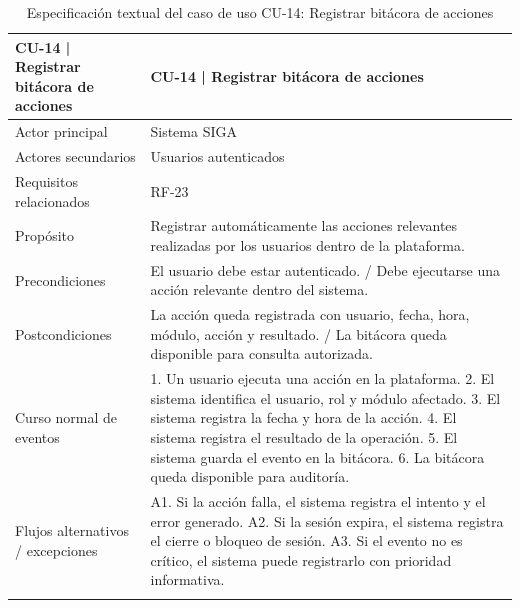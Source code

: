 \begingroup
\small
\begin{longtable}{|P{0.5000}|P{0.5000}|}
\hline
CU-14 | Registrar bitácora de acciones & CU-14 | Registrar bitácora de acciones \\ \hline
Actor principal & Sistema SIGA \\ \hline
Actores secundarios & Usuarios autenticados \\ \hline
Requisitos relacionados & RF-23 \\ \hline
Propósito & Registrar automáticamente las acciones relevantes realizadas por los usuarios dentro de la plataforma. \\ \hline
Precondiciones & El usuario debe estar autenticado. / Debe ejecutarse una acción relevante dentro del sistema. \\ \hline
Postcondiciones & La acción queda registrada con usuario, fecha, hora, módulo, acción y resultado. / La bitácora queda disponible para consulta autorizada. \\ \hline
Curso normal de eventos & 1. Un usuario ejecuta una acción en la plataforma. 2. El sistema identifica el usuario, rol y módulo afectado. 3. El sistema registra la fecha y hora de la acción. 4. El sistema registra el resultado de la operación. 5. El sistema guarda el evento en la bitácora. 6. La bitácora queda disponible para auditoría. \\ \hline
Flujos alternativos / excepciones & A1. Si la acción falla, el sistema registra el intento y el error generado. A2. Si la sesión expira, el sistema registra el cierre o bloqueo de sesión. A3. Si el evento no es crítico, el sistema puede registrarlo con prioridad informativa. \\ \hline
\caption{Especificación textual del caso de uso CU-14: Registrar bitácora de acciones}
\end{longtable}
\endgroup

